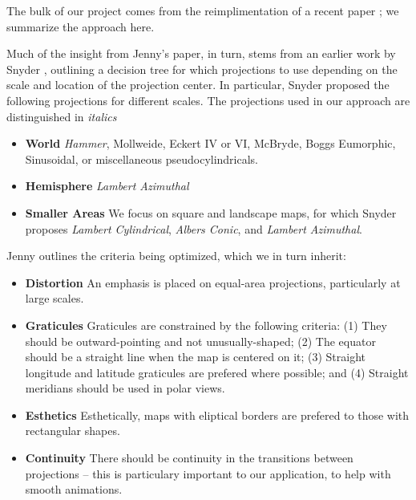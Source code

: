 The bulk of our project comes from the reimplimentation of a recent paper
  \cite{key:2012jenny-maps}; we summarize the approach here.

Much of the insight from Jenny's paper, in turn, stems from an earlier work
  by Snyder \cite{key:1987snyder-maps}, outlining a decision tree for which
  projections to use depending on the scale and location of the projection
  center.
In particular, Snyder proposed the following projections for different scales.
The projections used in our approach are distinguished in \textit{italics}

\begin{itemize}
  \item \textbf{World} \textit{Hammer}, Mollweide, Eckert IV or VI,
        McBryde, Boggs Eumorphic, Sinusoidal, or miscellaneous pseudocylindricals.
  \item \textbf{Hemisphere} \textit{Lambert Azimuthal}
  \item \textbf{Smaller Areas} We focus on square and landscape maps, for which
        Snyder proposes \textit{Lambert Cylindrical}, \textit{Albers Conic},
        and \textit{Lambert Azimuthal}.
\end{itemize}

Jenny outlines the criteria being optimized, which we in turn inherit:

\begin{itemize}
  \item \textbf{Distortion} An emphasis is placed on equal-area projections,
        particularly at large scales.
  \item \textbf{Graticules} Graticules are constrained by the
        following criteria:
        (1) They should be outward-pointing and not unusually-shaped;
        (2) The equator should be a straight line when the map is centered on it;
        (3) Straight longitude and latitude graticules are prefered where possible;
        and
        (4) Straight meridians should be used in polar views.
  \item \textbf{Esthetics} Esthetically, maps with eliptical borders are
        prefered to those with rectangular shapes.
  \item \textbf{Continuity} There should be continuity in the transitions
        between projections -- this is particulary important to our application,
        to help with smooth animations.
\end{itemize}


